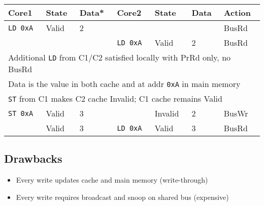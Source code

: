 \begin{tabular}{lll|lll|l}
  \hline
  Core1 & State & Data* & Core2 & State & Data & Action \\
  \hline
  \texttt{LD 0xA} & \textsf{Valid} & 2 &&& & BusRd\\
  &&&\texttt{LD 0xA} & \textsf{Valid} & 2 & BusRd\\
  \hline
  \multicolumn{7}{l}{Additional \texttt{LD} from C1/C2 satisfied locally with PrRd only, no BusRd}\\
  \hline
  \multicolumn{7}{l}{Data is the value in both cache and at addr \texttt{0xA} in main memory}\\
  \hline
  \multicolumn{7}{l}{\texttt{ST} from C1 makes C2 cache \textsf{Invalid}; C1 cache remains \textsf{Valid}}\\
  \hline
  \texttt{ST 0xA} & \textsf{Valid} & 3 & & \textsf{Invalid} & 2 & BusWr\\
   & \textsf{Valid} & 3 & \texttt{LD 0xA} & \textsf{Valid} & 3 & BusRd\\
  \hline
\end{tabular}
\subsection*{Drawbacks}
\begin{itemize}
\item Every write updates cache and main memory (write-through)
\item Every write requires broadcast and snoop on shared bus (expensive)
\end{itemize}
\columnbreak
